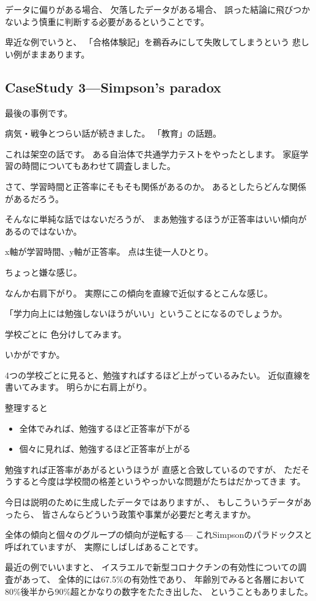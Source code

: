 \documentclass[uplatex,jis2004,dvipdfmx,12pt]{jsarticle}
\begin{document}
データに偏りがある場合、
欠落したデータがある場合、
誤った結論に飛びつかないよう慎重に判断する必要があるということです。

卑近な例でいうと、
「合格体験記」を鵜呑みにして失敗してしまうという
悲しい例がままあります。


\subsection{CaseStudy 3---Simpson's paradox}
最後の事例です。

病気・戦争とつらい話が続きました。
「教育」の話題。

これは架空の話です。
ある自治体で共通学力テストをやったとします。
家庭学習の時間についてもあわせて調査しました。


さて、学習時間と正答率にそもそも関係があるのか。
あるとしたらどんな関係があるだろう。

そんなに単純な話ではないだろうが、
まあ勉強するほうが正答率はいい傾向があるのではないか。


x軸が学習時間、y軸が正答率。
点は生徒一人ひとり。

ちょっと嫌な感じ。

なんか右肩下がり。
実際にこの傾向を直線で近似するとこんな感じ。

「学力向上には勉強しないほうがいい」ということになるのでしょうか。

学校ごとに
色分けしてみます。

いかがですか。

4つの学校ごとに見ると、勉強すればするほど上がっているみたい。
近似直線を書いてみます。
明らかに右肩上がり。

整理すると
\begin{itemize}[itemsep=5pt]
 \item 全体でみれば、勉強するほど正答率が下がる
 \item 個々に見れば、勉強するほど正答率が上がる
\end{itemize}

勉強すれば正答率があがるというほうが
直感と合致しているのですが、
ただそうすると今度は学校間の格差というやっかいな問題がたちはだかってきま
す。

今日は説明のために生成したデータではありますが、、
もしこういうデータがあったら、
皆さんならどういう政策や事業が必要だと考えますか。


全体の傾向と個々のグループの傾向が逆転する---
これSimpsonのパラドックスと呼ばれていますが、
実際にしばしばあることです。

最近の例でいいますと、
イスラエルで新型コロナクチンの有効性についての調査があって、
全体的には67.5\%の有効性であり、
年齢別でみると各層において80\%後半から90\%超とかなりの数字をたたき出した、
ということもありました。
\end{document}
